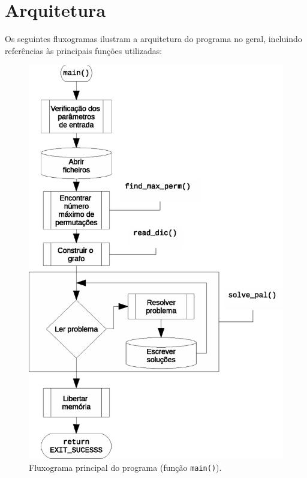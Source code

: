 \documentclass[portuguese, a4paper]{article}
\begin{document}
\section{Arquitetura}
	\par
	Os seguintes fluxogramas ilustram a arquitetura do programa no geral,
	incluindo referências às principais funções utilizadas:
	\begin{figure}[H]
		\centering
		\includegraphics[width=0.70\linewidth]{main}
		\caption{Fluxograma principal do programa (função \texttt{main()}).}
	\end{figure}
\end{document}
